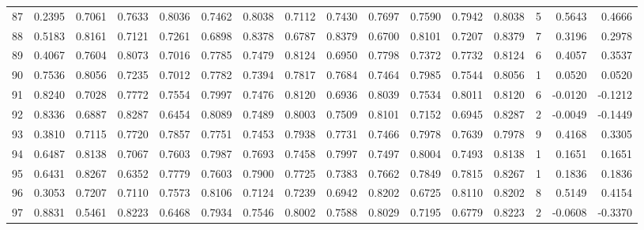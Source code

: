 \begin{tabular}{lrrrrrrrrrrrrrrr}
87  &      0.2395 &  0.7061 &  0.7633 &  0.8036 &  0.7462 &  0.8038 &  0.7112 &  0.7430 &  0.7697 &  0.7590 &   0.7942 &     0.8038 &      5 &                    0.5643 &                     0.4666 \\
88  &      0.5183 &  0.8161 &  0.7121 &  0.7261 &  0.6898 &  0.8378 &  0.6787 &  0.8379 &  0.6700 &  0.8101 &   0.7207 &     0.8379 &      7 &                    0.3196 &                     0.2978 \\
89  &      0.4067 &  0.7604 &  0.8073 &  0.7016 &  0.7785 &  0.7479 &  0.8124 &  0.6950 &  0.7798 &  0.7372 &   0.7732 &     0.8124 &      6 &                    0.4057 &                     0.3537 \\
90  &      0.7536 &  0.8056 &  0.7235 &  0.7012 &  0.7782 &  0.7394 &  0.7817 &  0.7684 &  0.7464 &  0.7985 &   0.7544 &     0.8056 &      1 &                    0.0520 &                     0.0520 \\
91  &      0.8240 &  0.7028 &  0.7772 &  0.7554 &  0.7997 &  0.7476 &  0.8120 &  0.6936 &  0.8039 &  0.7534 &   0.8011 &     0.8120 &      6 &                   -0.0120 &                    -0.1212 \\
92  &      0.8336 &  0.6887 &  0.8287 &  0.6454 &  0.8089 &  0.7489 &  0.8003 &  0.7509 &  0.8101 &  0.7152 &   0.6945 &     0.8287 &      2 &                   -0.0049 &                    -0.1449 \\
93  &      0.3810 &  0.7115 &  0.7720 &  0.7857 &  0.7751 &  0.7453 &  0.7938 &  0.7731 &  0.7466 &  0.7978 &   0.7639 &     0.7978 &      9 &                    0.4168 &                     0.3305 \\
94  &      0.6487 &  0.8138 &  0.7067 &  0.7603 &  0.7987 &  0.7693 &  0.7458 &  0.7997 &  0.7497 &  0.8004 &   0.7493 &     0.8138 &      1 &                    0.1651 &                     0.1651 \\
95  &      0.6431 &  0.8267 &  0.6352 &  0.7779 &  0.7603 &  0.7900 &  0.7725 &  0.7383 &  0.7662 &  0.7849 &   0.7815 &     0.8267 &      1 &                    0.1836 &                     0.1836 \\
96  &      0.3053 &  0.7207 &  0.7110 &  0.7573 &  0.8106 &  0.7124 &  0.7239 &  0.6942 &  0.8202 &  0.6725 &   0.8110 &     0.8202 &      8 &                    0.5149 &                     0.4154 \\
97  &      0.8831 &  0.5461 &  0.8223 &  0.6468 &  0.7934 &  0.7546 &  0.8002 &  0.7588 &  0.8029 &  0.7195 &   0.6779 &     0.8223 &      2 &                   -0.0608 &                    -0.3370 \\

\end{tabular}
